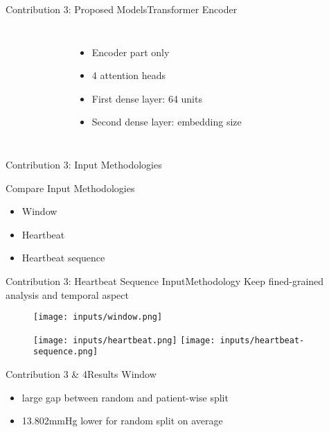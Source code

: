 \begin{frame}{Contribution 3: Proposed Models}{Transformer Encoder}
    \begin{columns}
        \begin{figure}
            
        \end{figure}

        \begin{itemize}
            \item Encoder part only
            \item 4 attention heads
            \item First dense layer: 64 units
            \item Second dense layer: embedding size
        \end{itemize}
    \end{columns}
\end{frame}

\begin{frame}{Contribution 3: Input Methodologies}
    \begin{block}{Compare Input Methodologies}
        \begin{itemize}
            \item Window
            \item Heartbeat
            \item Heartbeat sequence
        \end{itemize}
    \end{block}
\end{frame}

\begin{frame}{Contribution 3: Heartbeat Sequence Input}{Methodology}
    Keep fined-grained analysis and temporal aspect
    \begin{figure}
        \texttt{[image: inputs/window.png]}

        \texttt{[image: inputs/heartbeat.png]}
        \hfill
        \texttt{[image: inputs/heartbeat-sequence.png]}
    \end{figure}
\end{frame}


\begin{frame}{Contribution 3 \& 4}{Results}
    \centering
    Window
    \begin{figure}
        
        \hfill
        
    \end{figure}
    \begin{itemize}
        \item large gap between random and patient-wise split
        \item 13.802mmHg lower for random split on average
    \end{itemize}
\end{frame}

